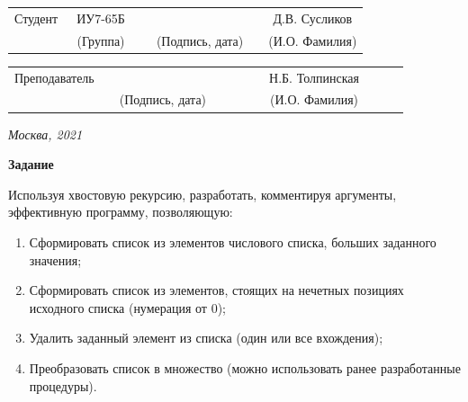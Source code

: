 \documentclass[12pt, a4paper]{extarticle}
\begin{document}
\noindent
{}
\\

\noindent
{}
\\

\vspace{1.5cm}
\noindent
\begin{tabular}{l c c c c c}
	Студент      & ~ИУ7-65Б~               & \hspace{2.5cm} & \hspace{2cm}                 & &  Д.В. Сусликов \\\cline{2-2}\cline{4-4} \cline{6-6} 
	\hspace{3cm} & {\footnotesize(Группа)} &                & {\footnotesize(Подпись, дата)} & & {\footnotesize(И.О. Фамилия)}
\end{tabular}

\noindent
\begin{tabular}{l c c c c}
	Преподаватель & \hspace{5cm}   & \hspace{2cm}                 & & ~~~~~~Н.Б. Толпинская~~~~~~\\\cline{3-3} \cline{5-5} 
	\hspace{3cm}  &                & {\footnotesize(Подпись, дата)} & & {\footnotesize(И.О. Фамилия)}
\end{tabular}

\vspace{0.6cm}
\begin{center}	
	\vfill
	\large \textit {Москва, 2021}
\end{center}

\thispagestyle {empty}
\pagebreak

\clearpage

\textbf{Задание}\par

Используя хвостовую рекурсию, разработать, комментируя аргументы, эффективную программу, позволяющую:

\begin{enumerate}
	\item Сформировать список из элементов числового списка, больших заданного значения;
	\item Сформировать список из элементов, стоящих на нечетных позициях исходного списка (нумерация от 0);
	\item Удалить заданный элемент из списка (один или все вхождения);
	\item Преобразовать список в множество (можно использовать ранее разработанные процедуры).
\end{enumerate}
\end{document}
